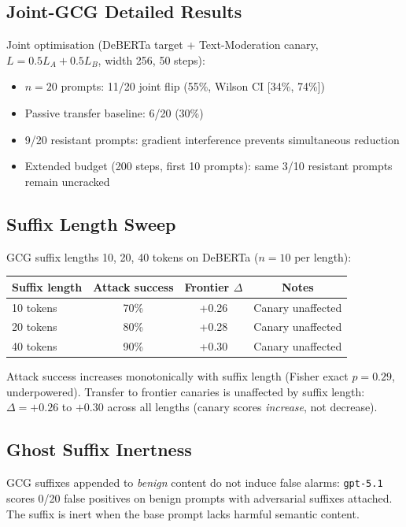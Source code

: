 \documentclass{article}
\begin{document}
\subsection{Joint-GCG Detailed Results}

Joint optimisation (DeBERTa target + Text-Moderation canary, $L = 0.5 L_A + 0.5 L_B$, width 256, 50 steps):

\begin{itemize}
\item $n{=}20$ prompts: 11/20 joint flip (55\%, Wilson CI [34\%, 74\%])
\item Passive transfer baseline: 6/20 (30\%)
\item 9/20 resistant prompts: gradient interference prevents simultaneous reduction
\item Extended budget (200 steps, first 10 prompts): same 3/10 resistant prompts remain uncracked
\end{itemize}

\subsection{Suffix Length Sweep}

GCG suffix lengths 10, 20, 40 tokens on DeBERTa ($n{=}10$ per length):

\begin{table}[h]
\centering
\small
\begin{tabular}{lccc}
\toprule
\textbf{Suffix length} & \textbf{Attack success} & \textbf{Frontier $\Delta$} & \textbf{Notes} \\
\midrule
10 tokens & 70\% & +0.26 & Canary unaffected \\
20 tokens & 80\% & +0.28 & Canary unaffected \\
40 tokens & 90\% & +0.30 & Canary unaffected \\
\bottomrule
\end{tabular}
\end{table}

Attack success increases monotonically with suffix length (Fisher exact $p = 0.29$, underpowered). Transfer to frontier canaries is unaffected by suffix length: $\Delta = +0.26$ to $+0.30$ across all lengths (canary scores \emph{increase}, not decrease).

\subsection{Ghost Suffix Inertness}

GCG suffixes appended to \emph{benign} content do not induce false alarms: \texttt{gpt-5.1} scores 0/20 false positives on benign prompts with adversarial suffixes attached. The suffix is inert when the base prompt lacks harmful semantic content.
\end{document}
